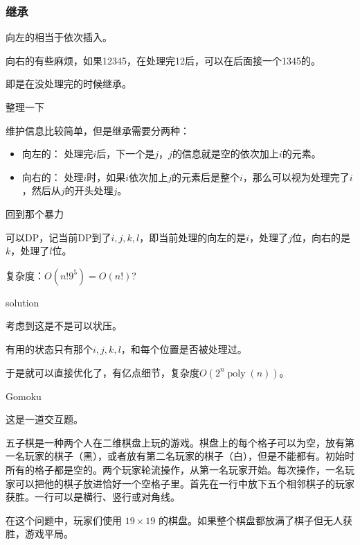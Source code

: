 \documentclass[10pt]{beamer}
\begin{document}
	\clearpage
	\begin{frame}
		\frametitle{继承}

		 向左的相当于依次插入。

		 向右的有些麻烦，如果12345，在处理完12后，可以在后面接一个1345的。
		
		 即是在没处理完的时候继承。
	\end{frame}
	\clearpage
	\begin{frame}{整理一下}
	
		 维护信息比较简单，但是继承需要分两种：

		\begin{itemize}
			\item 向左的： 处理完$i$后，下一个是$j$，$j$的信息就是空的依次加上$i$的元素。
			\item 向右的： 处理$i$时，如果$i$依次加上$j$的元素后是整个$i$，那么可以视为处理完了$i$，然后从$j$的开头处理$j$。
		\end{itemize}
	
	\end{frame}
	\clearpage
	\begin{frame}{回到那个暴力}
	
		 可以DP，记当前DP到了$i,j,k,l$，即当前处理的向左的是$i$，处理了$j$位，向右的是$k$，处理了$l$位。

		 复杂度：$O(n!9^5)=O(n!)$?
	
	\end{frame}
	\clearpage
	\begin{frame}{solution}
	
		 考虑到这是不是可以状压。

		 有用的状态只有那个$i,j,k,l$，和每个位置是否被处理过。

		 于是就可以直接优化了，有亿点细节，复杂度$O(2^n\operatorname{poly}(n))$。
	\end{frame}
	\clearpage
	\begin{frame}{Gomoku}
	
		这是一道交互题。

		五子棋是一种两个人在二维棋盘上玩的游戏。棋盘上的每个格子可以为空，放有第一名玩家的棋子（黑），或者放有第二名玩家的棋子（白），但是不能都有。初始时所有的格子都是空的。两个玩家轮流操作，从第一名玩家开始。每次操作，一名玩家可以把他的棋子放进恰好一个空格子里。首先在一行中放下五个相邻棋子的玩家获胜。一行可以是横行、竖行或对角线。

		在这个问题中，玩家们使用 $19\times 19$ 的棋盘。如果整个棋盘都放满了棋子但无人获胜，游戏平局。
	\end{frame}
	\clearpage
\end{document}
